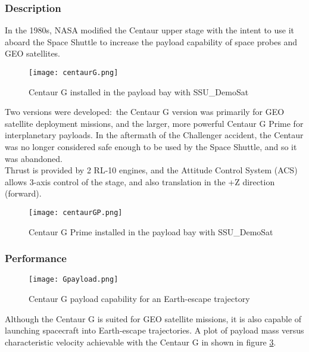\documentclass[Space_Shuttle_Ultra_Manual.tex]{subfiles}
\begin{document}
\begin{multicols*}{2}
\renewcommand{\cfttoctitlefont}{\bf}
\localtableofcontents
\subsubsection{Description}
\noindent
In the 1980s, NASA modified the Centaur upper stage with the intent to use it aboard the Space Shuttle to increase the payload capability of space probes and GEO satellites.\\

\begin{figure}[H]
	\centering
	\captionsetup{justification=centering}
  \texttt{[image: centaurG.png]}
  \caption{Centaur G installed in the payload bay with SSU\_DemoSat}
  \label{fig:centaurG}
\end{figure}

Two versions were developed$\colon$ the Centaur G version was primarily for GEO satellite deployment missions, and the larger, more powerful Centaur G Prime for interplanetary payloads. In the aftermath of the Challenger accident, the Centaur was no longer considered safe enough to be used by the Space Shuttle, and so it was abandoned.
\\
Thrust is provided by 2 RL-10 engines, and the Attitude Control System (ACS) allows 3-axis control of the stage, and also translation in the +Z direction (forward).

\begin{figure}[H]
	\centering
	\captionsetup{justification=centering}
  \texttt{[image: centaurGP.png]}
  \caption{Centaur G Prime installed in the payload bay with SSU\_DemoSat}
  \label{fig:centaurGP}
\end{figure}

\subsubsection{Performance}
\begin{figure}[H]
	\centering
	\captionsetup{justification=centering}
  \texttt{[image: Gpayload.png]}
  \caption{Centaur G payload capability for an Earth-escape trajectory}
  \label{fig:Gpayload}
\end{figure}
\noindent
Although the Centaur G is suited for GEO satellite missions, it is also capable of launching spacecraft into Earth-escape trajectories. A plot of payload mass versus characteristic velocity achievable with the Centaur G in shown in figure \ref{fig:Gpayload}.


\end{multicols*}
\end{document}
